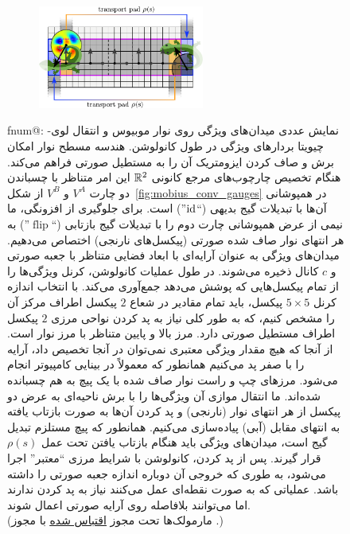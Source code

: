 \begin{figure}
	\begin{figure}
		\vspace{-\baselineskip}
		\includegraphics[width=0.6\textwidth]{figures/mobius_conv_numerical.pdf}
	\end{figure}
	\makeatletter
	{\protect{}}%
	\small %
	\csname fnum@\@captype\endcsname: %
	\makeatother
	نمایش عددی میدان‌های ویژگی روی نوار موبیوس و انتقال لوی-چیویتا بردارهای ویژگی در طول کانولوشن.
	هندسه مسطح نوار امکان برش و صاف کردن ایزومتریک آن را به مستطیل صورتی فراهم می‌کند.
	هنگام تخصیص چارچوب‌های مرجع کانونی $\mathbb{R}^2$ این امر متناظر با چسباندن دو چارت $V^A$ و $V^B$ از شکل~\ref{fig:mobius_conv_gauges} در همپوشانی آن‌ها با تبدیلات گیج بدیهی (``$\mathrm{id}$'') است.
	برای جلوگیری از افزونگی، ما نیمی از عرض همپوشانی چارت دوم را با تبدیلات گیج بازتابی (``$\operatorname{flip}$'') به هر انتهای نوار صاف شده صورتی (پیکسل‌های نارنجی) اختصاص می‌دهیم.
	میدان‌های ویژگی به عنوان آرایه‌ای با ابعاد فضایی متناظر با جعبه صورتی و $c$ کانال ذخیره می‌شوند.
	در طول عملیات کانولوشن، کرنل ویژگی‌ها را از تمام پیکسل‌هایی که پوشش می‌دهد جمع‌آوری می‌کند.
	با انتخاب اندازه کرنل $5\times5$ پیکسل، باید تمام مقادیر در شعاع $2$ پیکسل اطراف مرکز آن را مشخص کنیم، که به طور کلی نیاز به پد کردن نواحی مرزی $2$ پیکسل اطراف مستطیل صورتی دارد.
	مرز بالا و پایین متناظر با مرز نوار است.
	از آنجا که هیچ مقدار ویژگی معتبری نمی‌توان در آنجا تخصیص داد، آرایه را با صفر پد می‌کنیم همانطور که معمولاً در بینایی کامپیوتر انجام می‌شود.
	مرزهای چپ و راست نوار صاف شده با یک پیچ به هم چسبانده شده‌اند.
	ما انتقال موازی آن ویژگی‌ها را با برش ناحیه‌ای به عرض دو پیکسل از هر انتهای نوار (نارنجی) و پد کردن آن‌ها به صورت بازتاب یافته به انتهای مقابل (آبی) پیاده‌سازی می‌کنیم.
	همانطور که پیچ مستلزم تبدیل گیج است، میدان‌های ویژگی باید هنگام بازتاب یافتن تحت عمل $\rho(s)$ قرار گیرند.
	پس از پد کردن، کانولوشن با شرایط مرزی ``معتبر'' اجرا می‌شود، به طوری که خروجی آن دوباره اندازه جعبه صورتی را داشته باشد.
	عملیاتی که به صورت نقطه‌ای عمل می‌کنند نیاز به پد کردن ندارند اما می‌توانند بلافاصله روی آرایه صورتی اعمال شوند.
	{
		\\ \color{gray} \scriptsize
		(مارمولک‌ها تحت مجوز 
		\href{https://github.com/twitter/twemoji/blob/gh-pages/LICENSE-GRAPHICS}{\underline{اقتباس شده}}
		با مجوز .)
	}
	\label{fig:mobius_conv_numerical}
\end{figure}

